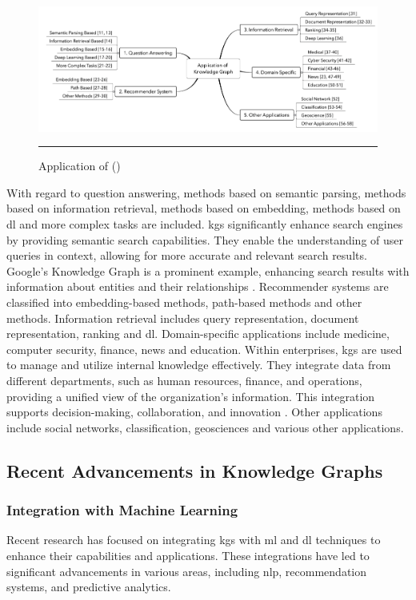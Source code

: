 \begin{figure}[htbp]
    \centering
 \includegraphics[width=\textwidth]{figures/literature-review/kg-application-fields.png}
     \rule{35em}{0.5pt}
    \caption{Application of  (\textcite{Zou2020})} 
 \label{fig:kg-application-fields}
\end{figure}

With regard to question answering, methods based on semantic parsing, methods based on information retrieval, methods based on embedding, methods based on \gls{dl} and more complex tasks are included.
\glspl{kg} significantly enhance search engines by providing semantic search capabilities. They enable the understanding of user queries in context, allowing for more accurate and relevant search results. Google's Knowledge Graph is a prominent example, enhancing search results with information about entities and their relationships \cite{singhal2012introducing}.
Recommender systems are classified into embedding-based methods, path-based methods and other methods. Information retrieval includes query representation, document representation, ranking and \gls{dl}. Domain-specific applications include medicine, computer security, finance, news and education.
Within enterprises, \glspl{kg} are used to manage and utilize internal knowledge effectively. They integrate data from different departments, such as human resources, finance, and operations, providing a unified view of the organization's information. This integration supports decision-making, collaboration, and innovation \cite{pujara2013knowledge}.
Other applications include social networks, classification, geosciences and various other applications.


\subsection*{Recent Advancements in Knowledge Graphs}

\subsubsection*{Integration with Machine Learning}
Recent research has focused on integrating \glspl{kg} with \gls{ml} and \gls{dl} techniques to enhance their capabilities and applications. These integrations have led to significant advancements in various areas, including \gls{nlp}, recommendation systems, and predictive analytics.

